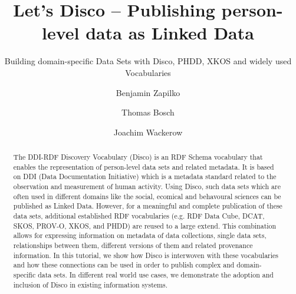 \documentclass{llncs}
\begin{document}
%
%
\title{Let’s Disco – Publishing person-level data as Linked Data}
\subtitle{Building domain-specific Data Sets with Disco, PHDD, XKOS and widely used Vocabularies
}
%
%
\author{Benjamin Zapilko \and Thomas Bosch \and Joachim Wackerow}
%
%

\maketitle              %

\begin{abstract}
The DDI-RDF Discovery Vocabulary (Disco) is an RDF Schema vocabulary that enables the representation of person-level data sets and related metadata.
It is based on DDI (Data Documentation Initiative) which is a metadata standard related to the observation and measurement of human activity.
Using Disco, such data sets which are often used in different domains like the social, ecomical and behavoural sciences can be published as Linked Data. 
However, for a meaningful and complete publication of these data sets, additional established RDF vocabularies (e.g. RDF Data Cube, DCAT, SKOS, PROV-O, XKOS, and PHDD) are reused to a large extend. 
This combination allows for expressing information on metadata of data collections, single data sets, relationships between them, different versions of them and related provenance information. 
In this tutorial, we show how Disco is interwoven with these vocabularies and how these connections can be used in order to publish complex and domain-specific data sets.
In different real world use cases, we demonstrate the adoption and inclusion of Disco in existing information systems. 

 

\end{abstract}
%
\end{document}
